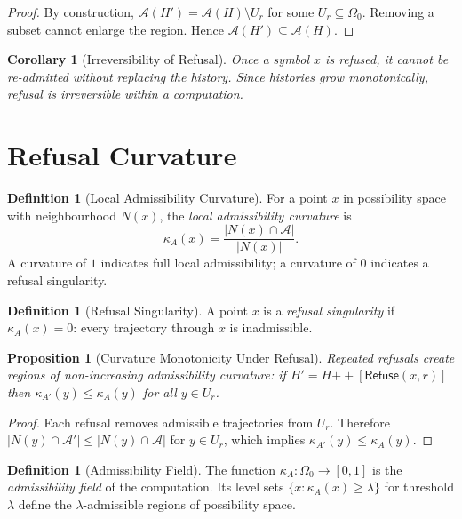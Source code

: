 \documentclass[12pt, a4paper, openany]{book}
\theoremstyle{plain}
\newtheorem{proposition}[theorem]{Proposition}
\newtheorem{corollary}[theorem]{Corollary}
\theoremstyle{definition}
\newtheorem{definition}[theorem]{Definition}
\theoremstyle{remark}
\newcommand{\Refuse}{\mathsf{Refuse}}
\newcommand{\calA}{\mathcal{A}}
\begin{document}
\begin{proof}
By construction, $\calA(H') = \calA(H) \setminus U_r$ for some $U_r \subseteq \Omega_0$.
Removing a subset cannot enlarge the region. Hence $\calA(H') \subseteq \calA(H)$.
\end{proof}

\begin{corollary}[Irreversibility of Refusal]
Once a symbol $x$ is refused, it cannot be re-admitted without replacing the
history. Since histories grow monotonically, refusal is irreversible within a
computation.
\end{corollary}

\section{Refusal Curvature}

\begin{definition}[Local Admissibility Curvature]
For a point $x$ in possibility space with neighbourhood $N(x)$,
the \emph{local admissibility curvature} is
\[
\kappa_A(x) = \frac{|N(x) \cap \calA|}{|N(x)|}.
\]
A curvature of $1$ indicates full local admissibility; a curvature of $0$
indicates a refusal singularity.
\end{definition}

\begin{definition}[Refusal Singularity]
A point $x$ is a \emph{refusal singularity} if $\kappa_A(x) = 0$: every
trajectory through $x$ is inadmissible.
\end{definition}

\begin{proposition}[Curvature Monotonicity Under Refusal]
Repeated refusals create regions of non-increasing admissibility curvature:
if $H' = H \mathbin{++} [\Refuse(x, r)]$ then $\kappa_{A'}(y) \leq \kappa_A(y)$
for all $y \in U_r$.
\end{proposition}

\begin{proof}
Each refusal removes admissible trajectories from $U_r$. Therefore
$|N(y) \cap \calA'| \leq |N(y) \cap \calA|$ for $y \in U_r$, which implies
$\kappa_{A'}(y) \leq \kappa_A(y)$.
\end{proof}

\begin{definition}[Admissibility Field]
The function $\kappa_A : \Omega_0 \to [0,1]$ is the \emph{admissibility field}
of the computation. Its level sets $\{x : \kappa_A(x) \geq \lambda\}$ for
threshold $\lambda$ define the $\lambda$-admissible regions of possibility space.
\end{definition}
\end{document}
